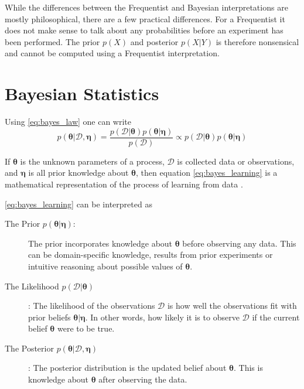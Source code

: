 While the differences between the Frequentist and Bayesian interpretations are mostly philosophical, there are a few practical differences. For a Frequentist it does not make sense to talk about any probabilities before an experiment has been performed. The prior $p(X)$ and posterior $p(X | Y)$ is therefore nonsensical and cannot be computed using a Frequentist interpretation.






\section{Bayesian Statistics}

Using \cref{eq:bayes_law} one can write 
\begin{equation}\label{eq:bayes_learning}
    p(\boldsymbol{\theta}| \mathcal{D}, \boldsymbol{\eta}) = \frac{p(\mathcal{D} | \boldsymbol{\theta}) p(\boldsymbol{\theta} | \boldsymbol{\eta})}{p(\mathcal{D})} \propto p(\mathcal{D} | \boldsymbol{\theta})p(\boldsymbol{\theta} | \boldsymbol{\eta})
\end{equation}

If $\boldsymbol{\theta}$ is the unknown parameters of a process, $\mathcal{D}$ is collected data or observations, and $\boldsymbol{\eta}$ is all prior knowledge about $\boldsymbol{\theta}$, then equation \eqref{eq:bayes_learning} is a mathematical representation of the process of learning from data \cite{Jaynes86bayesianmethods:}.

\cref{eq:bayes_learning} can be interpreted as
\begin{description}
    \item[The Prior $p(\boldsymbol{\theta} | \boldsymbol{\eta})$:] The prior incorporates knowledge about $\boldsymbol{\theta}$ before observing any data. This can be domain-specific knowledge, results from prior experiments or intuitive reasoning about possible values of $\boldsymbol{\theta}$. 
    \item[The Likelihood $p(\mathcal{D} | \boldsymbol{\theta})$]: The likelihood of the observations $\mathcal{D}$ is how well the observations fit with prior beliefs $\boldsymbol{\theta} | \boldsymbol{\eta}$. In other words, how likely it is to observe $\mathcal{D}$ if the current belief $\boldsymbol{\theta}$ were to be true.
    \item[The Posterior $p(\boldsymbol{\theta} | \mathcal{D}, \boldsymbol{\eta})$]: The posterior distribution is the updated belief about $\boldsymbol{\theta}$. This is knowledge about $\boldsymbol{\theta}$ after observing the data. 
\end{description}

